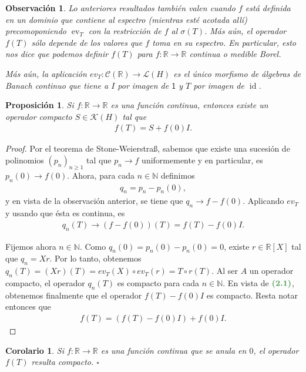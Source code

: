 \documentclass[11pt]{report}
\theoremstyle{colored}
\newtheorem{proposition}{Proposición}[section]
\newtheorem{corollary}{Corolario}[section]
\newtheorem{remark}{Observación}[section]
\newcommand{\N}{\mathbb{N}}
\newcommand{\R}{\mathbb{R}}
\newcommand{\ev}{\operatorname{ev}}
\newcommand{\id}{\operatorname{id}}
\newcommand{\paint}[1]{\color{color}{#1}}
\newcommand{\tpaint}[1]{\paint{\textbf{#1}}}
\begin{document}
\begin{remark} Lo anteriores resultados también valen cuando $f$ está definida en un dominio que contiene al espectro (mientras esté acotada allí) precomoponiendo $\ev_T$ con la restricción de $f$ al $\sigma(T)$. Más aún, el operador $f(T)$ sólo depende de los valores que $f$ toma en su espectro. En particular, esto nos dice que podemos definir $f(T)$ para $f : \R \to \R$ continua o medible Borel. 

Más aún, la aplicación $ev_T : \mathcal{C}(\R) \to \mathscr{L}(H)$ es el único morfismo de álgebras de Banach continuo que tiene a $I$ por imagen de $\mathsf{1}$ y $T$ por imagen de $\id$.
\end{remark}

\begin{proposition} Si $f : \R \to \R$ es una función continua, entonces existe un operador compacto $S \in \mathscr{K}(H)$ tal que
\begin{align*}
f(T) = S + f(0)I.
\end{align*}
\end{proposition}
\begin{proof} Por el teorema de Stone-Weierstraß, sabemos que existe una sucesión de polinomios $(p_n)_{n \geq 1}$ tal que $p_n \to f$ uniformemente y en particular, es $p_n(0) \to f(0)$. Ahora, para cada $n \in \N$ definimos
\begin{align*}
q_n = p_n - p_n(0),
\end{align*} 
y en vista de la observación anterior, se tiene que $q_n \to f - f(0)$. Aplicando $ev_T$ y usando que ésta es continua, es
\begin{align}
q_n(T) \to (f-f(0))(T) = f(T) - f(0)I.
\end{align}

Fijemos ahora $n \in \N$. Como $q_n(0) = p_n(0) - p_n(0) = 0$, existe $r \in \R[X]$ tal que $q_n = Xr$. Por lo tanto, obtenemos $q_n(T) = (Xr)(T) = ev_T(X) \circ ev_T(r) = T \circ r(T)$. Al ser $A$ un operador compacto, el operador $q_n(T)$ es compacto para cada $n \in \N$. En vista de $\tpaint{(2.1)}$, obtenemos finalmente que el operador $f(T) - f(0)I$ es compacto. Resta notar entonces que
\begin{align*}
f(T) = (f(T)-f(0)I) + f(0)I.
\end{align*}  
\end{proof}

\begin{corollary} Si $f : \R \to \R$ es una función continua que se anula en $0$, el operador $f(T)$ resulta compacto. $\square$
\end{corollary}
\end{document}
